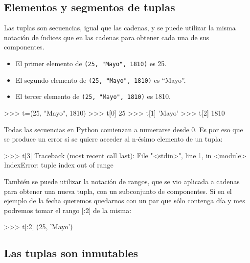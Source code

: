 \subsection{Elementos y segmentos de tuplas}

Las tuplas son secuencias, igual que las cadenas, y se puede utilizar la
misma notación de índices que en las cadenas para obtener cada una de sus
componentes. 

\begin{itemize}
\item El primer elemento de \lstinline!(25, "Mayo", 1810)! es 25.
\item El segundo elemento de \lstinline!(25, "Mayo", 1810)! es ``Mayo''.
\item El tercer elemento de \lstinline!(25, "Mayo", 1810)! es 1810.
\end{itemize}

\begin{codigo-python-sn}
>>> t=(25, "Mayo", 1810)
>>> t[0]
25
>>> t[1]
'Mayo'
>>> t[2]
1810
\end{codigo-python-sn}

\begin{atencion}
Todas las secuencias en Python comienzan a numerarse desde 0.  Es por eso
que se produce un error si se quiere acceder al n-ésimo elemento de un
tupla:

\begin{codigo-python-sn}
>>> t[3]
Traceback (most recent call last):
  File "<stdin>", line 1, in <module>
IndexError: tuple index out of range
\end{codigo-python-sn}
\end{atencion}

También se puede utilizar la notación de rangos, que se vio aplicada a
cadenas para obtener una nueva tupla, con un subconjunto de componentes. Si
en el ejemplo de la fecha queremos quedarnos con un par que sólo contenga
día y mes podremos tomar el rango [:2] de la misma:

\begin{codigo-python-sn}
>>> t[:2]
(25, 'Mayo')
\end{codigo-python-sn}


\subsection{Las tuplas son inmutables}

